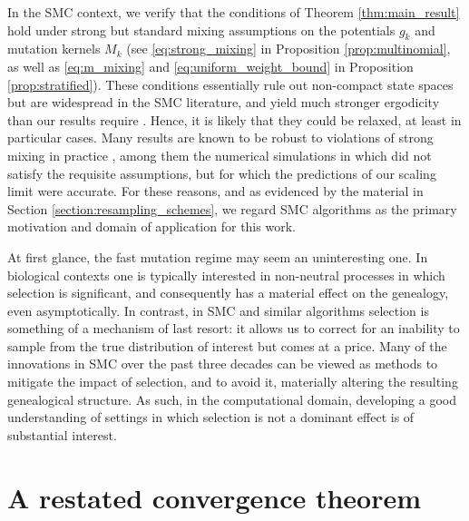 \documentclass[a4paper,11pt]{article}
\theoremstyle{definition}
\begin{document}
In the SMC context, we verify that the conditions of Theorem \ref{thm:main_result} hold under strong but standard mixing assumptions on the potentials $g_k$ and mutation kernels $M_k$ (see \eqref{eq:strong_mixing} in Proposition \ref{prop:multinomial}, as well as \eqref{eq:m_mixing} and \eqref{eq:uniform_weight_bound} in Proposition \ref{prop:stratified}).
These conditions essentially rule out non-compact state spaces but are widespread in the SMC literature, and yield much stronger ergodicity than our results require \cite{karjalainenetal:2023+}.
Hence, it is likely that they could be relaxed, at least in particular cases.
Many results are known to be robust to violations of strong mixing in practice \cite{cerou2011, chopin2004, delmoral2001, jacob2015, kuensch2005}, among them the numerical simulations in \cite[Section 3]{koskela2020annals} which did not satisfy the requisite assumptions, but for which the predictions of our scaling limit were accurate.
For these reasons, and as evidenced by the material in Section \ref{section:resampling_schemes}, we regard SMC algorithms as the primary motivation and domain of application for this work.

At first glance, the fast mutation regime may seem an uninteresting one.
In  biological contexts one is typically interested in non-neutral processes in which selection is significant, and consequently has a material effect on the genealogy, even asymptotically.
In contrast, in SMC and similar algorithms selection is something of a mechanism of last resort: it allows us to correct for an inability to sample from the true distribution of interest but comes at a price.
Many of the innovations in SMC over the past three decades can be viewed as methods to mitigate the impact of selection, and to avoid it, materially altering the resulting genealogical structure.
As such, in the computational domain, developing a good understanding of settings in which selection is not a dominant effect is of substantial interest.

\section{A restated convergence theorem}
\end{document}
